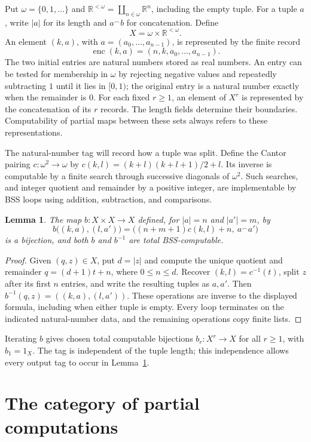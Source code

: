 \documentclass[11pt]{article}
\newtheorem{lemma}[theorem]{Lemma}
\newcommand{\R}{\mathbb R}
\newcommand{\N}{\omega}
\newcommand{\enc}{\operatorname{enc}}
\begin{document}
Put $\N=\{0,1,\ldots\}$ and
$\R^{<\omega}=\coprod_{n\in\N}\R^n$, including the empty tuple.
For a tuple $a$, write $|a|$ for its length and $a^\frown b$ for
concatenation. Define
\[
 X=\N\times\R^{<\omega}.
\]
An element $(k,a)$, with $a=(a_0,\ldots,a_{n-1})$, is represented by
the finite record
\[
 \enc(k,a)=(n,k,a_0,\ldots,a_{n-1}).
\]
The two initial entries are natural numbers stored as real numbers.
An entry can be tested for membership in $\N$ by rejecting negative
values and repeatedly subtracting $1$ until it lies in $[0,1)$;
the original entry is a natural number exactly when the remainder is $0$.
For each fixed $r\geq1$, an element of $X^r$ is represented by the
concatenation of its $r$ records. The length fields determine their
boundaries. Computability of partial maps between these sets always
refers to these representations.

The natural-number tag will record how a tuple was split.
Define the Cantor pairing $c:\N^2\to\N$ by
$c(k,l)=(k+l)(k+l+1)/2+l$. Its inverse is computable by a finite
search through successive diagonals of $\N^2$. Such searches, and
integer quotient and remainder by a positive integer, are implementable
by BSS loops using addition, subtraction, and comparisons.

\begin{lemma}\label{lem:pair}
The map $b:X\times X\to X$ defined, for $|a|=n$ and $|a'|=m$, by
\[
 b\bigl((k,a),(l,a')\bigr)
   =\bigl((n+m+1)c(k,l)+n,\ a^\frown a'\bigr)
\]
is a bijection, and both $b$ and $b^{-1}$ are total BSS-computable.
\end{lemma}

\begin{proof}
Given $(q,z)\in X$, put $d=|z|$ and compute the unique quotient and
remainder $q=(d+1)t+n$, where $0\leq n\leq d$.
Recover $(k,l)=c^{-1}(t)$, split $z$ after its first $n$ entries,
and write the resulting tuples as $a,a'$. Then
$b^{-1}(q,z)=((k,a),(l,a'))$.
These operations are inverse to the displayed formula, including
when either tuple is empty. Every loop terminates on the indicated
natural-number data, and the remaining operations copy finite lists.
\end{proof}

Iterating $b$ gives chosen total computable bijections
$b_r:X^r\to X$ for all $r\geq1$, with $b_1=1_X$.
The tag is independent of the tuple length; this independence allows
every output tag to occur in Lemma~\ref{lem:pair}.

\section{The category of partial computations}
\label{sec:category}
\end{document}
